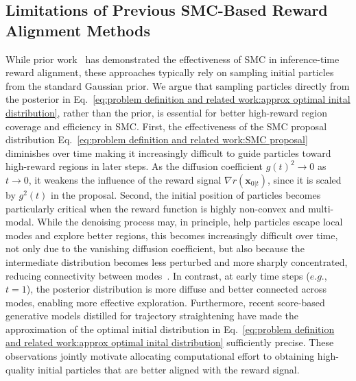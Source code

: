 \subsection{Limitations of Previous SMC-Based Reward Alignment Methods}
While prior work~\cite{kim2025DAS, dou2024fps, wu2023tds, trippe2023smcdiff, cardoso2024mcgdiff} has demonstrated the effectiveness of SMC in inference-time reward alignment, these approaches typically rely on sampling initial particles from the standard Gaussian prior. 
We argue that sampling particles directly from the posterior in Eq.~\ref{eq:problem definition and related work:approx optimal inital distribution}, rather than the prior, is essential for better high-reward region coverage and efficiency in SMC.
First, the effectiveness of the SMC proposal distribution Eq.~\ref{eq:problem definition and related work:SMC proposal} diminishes over time making it increasingly difficult to guide particles toward high-reward regions in later steps. As the diffusion coefficient $g(t)^2 \to 0$ as $t \to 0$, it weakens the influence of the reward signal $\nabla r(\mathbf{x}_{0|t})$, since it is scaled by $g^2(t)$ in the proposal.
Second, the initial position of particles becomes particularly critical when the reward function is highly non-convex and multi-modal. 
While the denoising process may, in principle, help particles escape local modes and explore better regions, this becomes increasingly difficult over time, not only due to the vanishing diffusion coefficient, but also because the intermediate distribution becomes less perturbed and more sharply concentrated, reducing connectivity between modes~\cite{kim2022dmcmc}. In contrast, at early time steps ($e.g.$, $t=1$), the posterior distribution is more diffuse and better connected across modes, enabling more effective exploration.
Furthermore, recent score-based generative models distilled for trajectory straightening have made the approximation of the optimal initial distribution in Eq.~\ref{eq:problem definition and related work:approx optimal inital distribution} sufficiently precise.
These observations jointly motivate allocating computational effort to obtaining high-quality initial particles that are better aligned with the reward signal.
